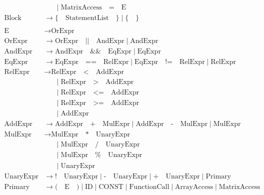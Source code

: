 \documentclass[letterpaper,12pt,oneside]{article}
\begin{document}
\begin{align*}
                  &\mathrel{\phantom{\rightarrow}} \mid \text{MatrixAccess} \quad \texttt{=} \quad \text{E} \\
\text{Block} &\rightarrow \texttt{\{} \quad \text{StatementList} \quad \texttt{\}} \mid \texttt{\{} \quad \texttt{\}} \\
\\
\text{E} &\rightarrow \text{OrExpr} \\
\text{OrExpr} &\rightarrow \text{OrExpr} \quad \texttt{||} \quad \text{AndExpr} \mid \text{AndExpr} \\
\text{AndExpr} &\rightarrow \text{AndExpr} \quad \texttt{\&\&} \quad \text{EqExpr} \mid \text{EqExpr} \\
\text{EqExpr} &\rightarrow \text{EqExpr} \quad \texttt{==} \quad \text{RelExpr} \mid \text{EqExpr} \quad \texttt{!=} \quad \text{RelExpr} \mid \text{RelExpr} \\
\text{RelExpr} &\rightarrow \text{RelExpr} \quad \texttt{<} \quad \text{AddExpr} \\
               &\mathrel{\phantom{\rightarrow}} \mid \text{RelExpr} \quad \texttt{>} \quad \text{AddExpr} \\
               &\mathrel{\phantom{\rightarrow}} \mid \text{RelExpr} \quad \texttt{<=} \quad \text{AddExpr} \\
               &\mathrel{\phantom{\rightarrow}} \mid \text{RelExpr} \quad \texttt{>=} \quad \text{AddExpr} \\
               &\mathrel{\phantom{\rightarrow}} \mid \text{AddExpr} \\
\text{AddExpr} &\rightarrow \text{AddExpr} \quad \texttt{+} \quad \text{MulExpr} \mid \text{AddExpr} \quad \texttt{-} \quad \text{MulExpr} \mid \text{MulExpr} \\
\text{MulExpr} &\rightarrow \text{MulExpr} \quad \texttt{*} \quad \text{UnaryExpr} \\
               &\mathrel{\phantom{\rightarrow}} \mid \text{MulExpr} \quad \texttt{/} \quad \text{UnaryExpr} \\
               &\mathrel{\phantom{\rightarrow}} \mid \text{MulExpr} \quad \texttt{\%} \quad \text{UnaryExpr} \\
               &\mathrel{\phantom{\rightarrow}} \mid \text{UnaryExpr} \\
\text{UnaryExpr} &\rightarrow \texttt{!} \quad \text{UnaryExpr} \mid \texttt{-} \quad \text{UnaryExpr} \mid \texttt{+} \quad \text{UnaryExpr} \mid \text{Primary} \\
\text{Primary} &\rightarrow \texttt{(} \quad \text{E} \quad \texttt{)} \mid \text{ID} \mid \text{CONST} \mid \text{FunctionCall} \mid \text{ArrayAccess} \mid \text{MatrixAccess} \\

\end{align*}
\end{document}
